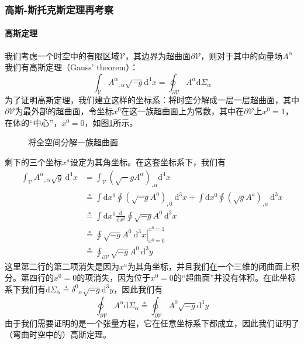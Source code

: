 \documentclass[hyperref, UTF8, a4paper]{ctexart}
\begin{document}
\subsubsection{高斯-斯托克斯定理再考察}
\paragraph{高斯定理}

我们考虑一个时空中的有限区域$\mathscr{V}$，其边界为超曲面$\partial \mathscr{V}$，则对于其中的向量场$A^{\alpha }$我们有高斯定理（Gauss' theorem）：
\begin{equation*}
	\int _{\mathscr{V}} A^{\alpha }{}_{;\alpha }\sqrt{-g}\mathrm{d}^{4} x=\oint _{\partial \mathscr{V}} A^{\alpha }\mathrm{d} \Sigma _{\alpha }
\end{equation*}
为了证明高斯定理，我们建立这样的坐标系：将时空分解成一层一层超曲面，其中$\partial \mathscr{V}$为最外部的超曲面，令坐标$x^{0}$在这一族超曲面上为常数，其中在$\partial \mathscr{V}$上$x^{0} =1$，在体的“中心”，$x^{0} =0$，如图\ref{foilation of gauss theorem}所示。

\begin{figure}
	\centering
	
	\caption{将全空间分解一族超曲面}
	\label{foilation of gauss theorem}
\end{figure}

剩下的三个坐标$x^{a}$设定为其角坐标。在这套坐标系下，我们有
\begin{equation*}
	\begin{aligned}
		\int _{\mathscr{V}} A^{\alpha }{}_{;\alpha }\sqrt{g} \ \mathrm{d}^{4} x & =\int _{\mathscr{V}}\left(\sqrt{-} gA^{\alpha }\right)_{,\alpha }\mathrm{d}^{4} x\\
		& \stackrel{*}{=}\int \mathrm{d} x^{0}\oint \left(\sqrt{-g} A^{0}\right)_{,0} \ \mathrm{d}^{3} x+\int \mathrm{d} x^{0}\oint \left(\sqrt{g} A^{a}\right)_{,a} \ \mathrm{d}^{3} x\\
		& \stackrel{*}{=}\int \mathrm{d} x^{0}\frac{\mathrm{d}}{\mathrm{d} x^{0}}\oint \sqrt{-g} A^{0} \ \mathrm{d}^{3} x\\
		& \stackrel{*}{=}\left. \oint \sqrt{-g} A^{0} \ \mathrm{d}^{3} x\right| _{x^{0} =0}^{x^{0} =1}\\
		& \stackrel{*}{=}\oint _{\partial \mathscr{V}}\sqrt{-g} A^{0} \ \mathrm{d}^{3} y
	\end{aligned}
\end{equation*}
这里第二行的第二项消失是因为$x^{a}$为其角坐标，并且我们在一个三维的闭曲面上积分。第四行的$x^{0} =0$的项消失，因为位于$x^{0} =0$的“超曲面”并没有体积。在此坐标系下我们有$\mathrm{d} \Sigma _{\alpha }\stackrel{*}{=} \delta ^{0}{}_{\alpha }\sqrt{-g}\mathrm{d}^{3} y$，因此我们有
\begin{equation*}
	\oint _{\partial \mathscr{V}} A^{\alpha }\mathrm{d} \Sigma _{\alpha }\stackrel{*}{=}\oint _{\partial \mathscr{V}} A^{0}\sqrt{-g}\mathrm{d}^{3} y
\end{equation*}
由于我们需要证明的是一个张量方程，它在任意坐标系下都成立，因此我们证明了（弯曲时空中的）高斯定理。
\end{document}

